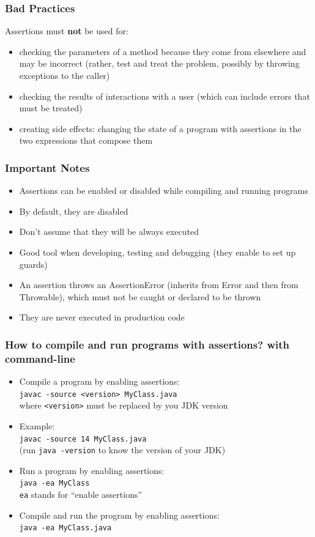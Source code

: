 \documentclass{beamer}
\begin{document}
\begin{frame}
  \frametitle{Bad Practices}
  Assertions must \textbf{not} be used for:
  \begin{itemize}
  \item checking the parameters of a method because they come from
    elsewhere and may be incorrect (rather, test and treat the
    problem, possibly by throwing exceptions to the caller)
  \item checking the results of interactions with a user (which can
    include errors that must be treated)
  \item creating side effects: changing the state of a program with
    assertions in the two expressions that compose them
  \end{itemize}
\end{frame}

\begin{frame}
  \frametitle{Important Notes}
  \begin{itemize}
  \item Assertions can be enabled or disabled while compiling and
    running programs
  \item By default, they are disabled
  \item Don't assume that they will be always executed
  \item Good tool when developing, testing and debugging (they enable
    to set up guards)
  \item An assertion throws an AssertionError (inherits from Error and
    then from Throwable), which must not be caught or declared to be
    thrown
  \item They are never executed in production code
  \end{itemize}
\end{frame}

\begin{frame}
  \frametitle{How to compile and run programs with assertions? with
    command-line}
  
  \begin{itemize}
  \item Compile a program by enabling assertions:\\
    \texttt{javac -source <version> MyClass.java}\\
    where \texttt{<version>} must be replaced by you JDK version
  \item Example:\\
    \texttt{javac -source 14 MyClass.java}\\
    (run \texttt{java -version} to know the version of your JDK)
  \item Run a program by enabling assertions:\\
    \texttt{java -ea MyClass}\\
    \texttt{ea} stands for ``enable assertions''
    
  \item Compile and run the program by enabling assertions:\\
    \texttt{java -ea MyClass.java}
  \end{itemize}
\end{frame}
\end{document}
